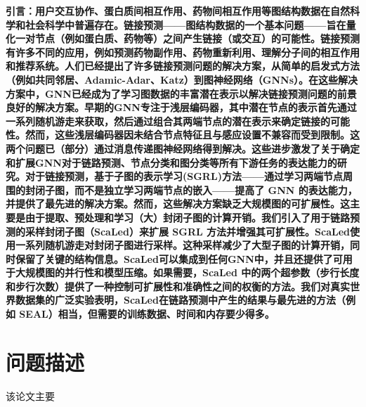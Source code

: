 \documentclass{article}
\begin{document}
\textbf{引言：用户交互协作、蛋白质间相互作用、药物间相互作用等图结构数据在自然科学和社会科学中普遍存在。链接预测——图结构数据的一个基本问题——旨在量化一对节点（例如蛋白质、药物等）之间产生链接（或交互）的可能性。链接预测有许多不同的应用，例如预测药物副作用、药物重新利用、理解分子间的相互作用和推荐系统。人们已经提出了许多链接预测问题的解决方案，从简单的启发式方法（例如共同邻居、Adamic-Adar、Katz）到图神经网络（GNNs）。在这些解决方案中，GNN已经成为了学习图数据的丰富潜在表示以解决链接预测问题的前景良好的解决方案。早期的GNN专注于浅层编码器，其中潜在节点的表示首先通过一系列随机游走来获取，然后通过组合其两端节点的潜在表示来确定链接的可能性。然而，这些浅层编码器因未结合节点特征且与感应设置不兼容而受到限制。这两个问题已（部分）通过消息传递图神经网络得到解决。这些进步激发了关于确定和扩展GNN对于链路预测、节点分类和图分类等所有下游任务的表达能力的研究。对于链接预测，基于子图的表示学习(SGRL)方法——通过学习两端节点周围的封闭子图，而不是独立学习两端节点的嵌入——提高了 GNN 的表达能力，并提供了最先进的解决方案。然而，这些解决方案缺乏大规模图的可扩展性。这主要是由于提取、预处理和学习（大）封闭子图的计算开销。我们引入了用于链路预测的采样封闭子图（ScaLed）来扩展 SGRL 方法并增强其可扩展性。ScaLed使用一系列随机游走对封闭子图进行采样。这种采样减少了大型子图的计算开销，同时保留了关键的结构信息。ScaLed可以集成到任何GNN中，并且还提供了可用于大规模图的并行性和模型压缩。如果需要，ScaLed 中的两个超参数（步行长度和步行次数）提供了一种控制可扩展性和准确性之间的权衡的方法。我们对真实世界数据集的广泛实验表明，ScaLed在链路预测中产生的结果与最先进的方法（例如 SEAL）相当，但需要的训练数据、时间和内存要少得多。}
\section*{问题描述}
该论文主要
\end{document}

